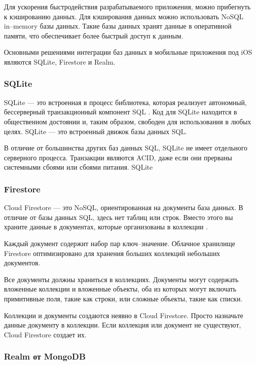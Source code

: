 Для ускорения быстродействия разрабатываемого приложения, можно прибегнуть к кэшированию данных. Для кэширования данных можно использовать NoSQL \cite{nosql} in--memory базы данных. Такие базы данных хранят данные в оперативной памяти, что обеспечивает более быстрый доступ к данным.

Основными решениями интеграции баз данных в мобильные приложения под iOS являются SQLite, Firestore и Realm.

\subsubsection{SQLite}

SQLite --- это встроенная в процесс библиотека, которая реализует автономный, бессерверный транзакционный компонент SQL  \cite{sqlite}. Код для SQLite находится в общественном достоянии и, таким образом, свободен для использования в любых целях. SQLite --- это встроенный движок базы данных SQL. 

В отличие от большинства других баз данных SQL, SQLite не имеет отдельного серверного процесса. Транзакции являются ACID, даже если они прерваны системными сбоями или сбоями питания. SQLite 

\subsubsection{Firestore}

Cloud Firestore --- это NoSQL, ориентированная на документы база данных. В отличие от базы данных SQL, здесь нет таблиц или строк. Вместо этого вы храните данные в документах, которые организованы в коллекции \cite{firebase}.

Каждый документ содержит набор пар ключ--значение. Облачное хранилище Firestore оптимизировано для хранения больших коллекций небольших документов.

Все документы должны храниться в коллекциях. Документы могут содержать вложенные коллекции и вложенные объекты, оба из которых могут включать примитивные поля, такие как строки, или сложные объекты, такие как списки.

Коллекции и документы создаются неявно в Cloud Firestore. Просто назначьте данные документу в коллекции. Если коллекция или документ не существуют, Cloud Firestore создает их.

\subsubsection{Realm от MongoDB}

